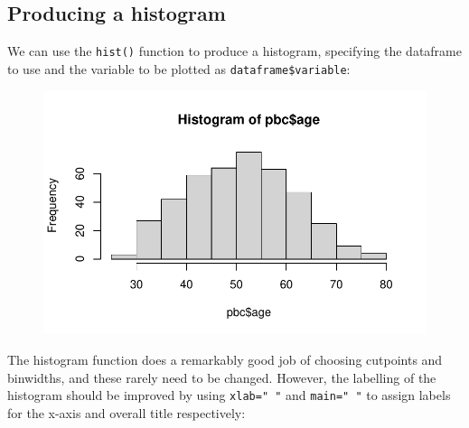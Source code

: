 \documentclass[
  a4paper,
]{memoir}
\newenvironment{Shaded}{\begin{snugshade}}{\end{snugshade}}
\newcommand{\AttributeTok}[1]{\textcolor[rgb]{0.00,0.00,0.00}{#1}}
\newcommand{\FunctionTok}[1]{\textcolor[rgb]{0.00,0.00,0.00}{#1}}
\newcommand{\NormalTok}[1]{\textcolor[rgb]{0.00,0.00,0.00}{#1}}
\newcommand{\SpecialCharTok}[1]{\textcolor[rgb]{0.00,0.00,0.00}{#1}}
\newcommand{\StringTok}[1]{\textcolor[rgb]{0.00,0.00,0.00}{#1}}
\begin{document}
\hypertarget{producing-a-histogram-1}{%
\subsection{Producing a histogram}\label{producing-a-histogram-1}}

We can use the \texttt{hist()} function to produce a histogram,
specifying the dataframe to use and the variable to be plotted as
\texttt{dataframe\$variable}:

\begin{Shaded}
\end{Shaded}

\begin{figure}[H]

{\centering \includegraphics{01-intro_files/figure-pdf/unnamed-chunk-92-1.pdf}

}

\end{figure}

The histogram function does a remarkably good job of choosing cutpoints
and binwidths, and these rarely need to be changed. However, the
labelling of the histogram should be improved by using
\texttt{xlab="\ "} and \texttt{main="\ "} to assign labels for the
x-axis and overall title respectively:

\begin{Shaded}
\end{Shaded}
\end{document}
